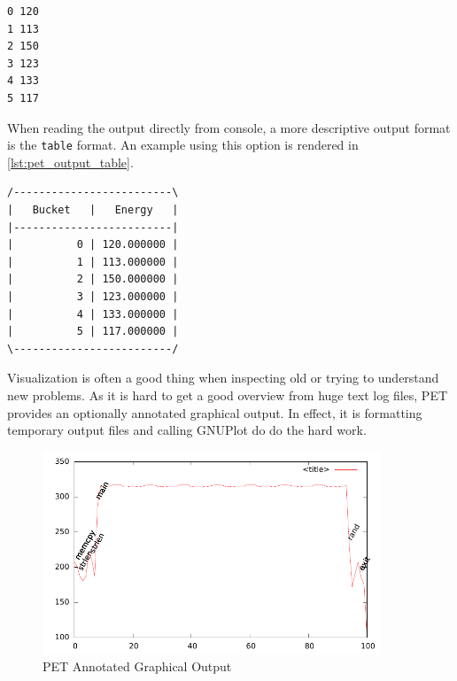 \begin{lstlisting}[label={lst:pet_output_plain},caption={PET Plain Output}]
0 120
1 113
2 150
3 123
4 133
5 117
\end{lstlisting}

When reading the output directly from console, a more descriptive output format
is the \texttt{table} format. An example using this option is rendered in
\autoref{lst:pet_output_table}.

\begin{lstlisting}[label={lst:pet_output_table},caption={PET Table Output}]
/-------------------------\
|   Bucket   |   Energy   |
|-------------------------|
|          0 | 120.000000 |
|          1 | 113.000000 |
|          2 | 150.000000 |
|          3 | 123.000000 |
|          4 | 133.000000 |
|          5 | 117.000000 |
\-------------------------/
\end{lstlisting}

Visualization is often a good thing when inspecting old or trying to understand new
problems. As it is hard to get a good overview from huge text log files, PET provides
an optionally annotated graphical output. In effect, it is formatting temporary output
files and calling GNUPlot do do the hard work.

\begin{figure}
    \includegraphics[width=0.9\textwidth]{figs/annot.pdf}
    \caption{PET Annotated Graphical Output}
    \label{fig:annot}
\end{figure}

